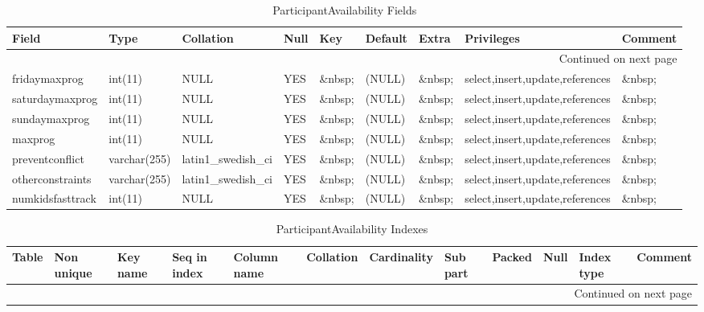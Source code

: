 \documentclass[tablesignature,landscape]{scrartcl}
\begin{document}
\begin{longtable}{|l|l|l|l|l|l|l|l|l|}
\caption{ParticipantAvailability Fields} \label{tbl:participantavailabilityfields}\\
\hline
 Field             &  Type          &  Collation                &  Null     &  Key      &  Default  &  Extra    &  Privileges                       &  Comment \\
\hline
\endhead
\hline\multicolumn{9}{r}{Continued on next page}\
\endfoot
\endlastfoot
\hline
 badgeid           &  varchar(15)   &  latin1\_{}swedish\_{}ci  &  \&nbsp;  &  PRI      &  \&nbsp;  &  \&nbsp;  &  select,insert,update,references  &  \&nbsp;  \\
 fridaymaxprog     &  int(11)       &  NULL                     &  YES      &  \&nbsp;  &  (NULL)   &  \&nbsp;  &  select,insert,update,references  &  \&nbsp;  \\
 saturdaymaxprog   &  int(11)       &  NULL                     &  YES      &  \&nbsp;  &  (NULL)   &  \&nbsp;  &  select,insert,update,references  &  \&nbsp;  \\
 sundaymaxprog     &  int(11)       &  NULL                     &  YES      &  \&nbsp;  &  (NULL)   &  \&nbsp;  &  select,insert,update,references  &  \&nbsp;  \\
 maxprog           &  int(11)       &  NULL                     &  YES      &  \&nbsp;  &  (NULL)   &  \&nbsp;  &  select,insert,update,references  &  \&nbsp;  \\
 preventconflict   &  varchar(255)  &  latin1\_{}swedish\_{}ci  &  YES      &  \&nbsp;  &  (NULL)   &  \&nbsp;  &  select,insert,update,references  &  \&nbsp;  \\
 otherconstraints  &  varchar(255)  &  latin1\_{}swedish\_{}ci  &  YES      &  \&nbsp;  &  (NULL)   &  \&nbsp;  &  select,insert,update,references  &  \&nbsp;  \\
 numkidsfasttrack  &  int(11)       &  NULL                     &  YES      &  \&nbsp;  &  (NULL)   &  \&nbsp;  &  select,insert,update,references  &  \&nbsp;  \\
\hline
\end{longtable}


\begin{longtable}{|l|l|l|l|l|l|l|l|l|l|l|l|}
\caption{ParticipantAvailability Indexes} \label{tbl:participantavailabilityindexes}\\
\hline
 Table                    &  Non unique  &  Key name  &  Seq in index  &  Column name  &  Collation  &  Cardinality  &  Sub part  &  Packed  &  Null     &  Index type  &  Comment \\
\hline
\endhead
\hline\multicolumn{12}{r}{Continued on next page}\
\endfoot
\endlastfoot
\hline
 ParticipantAvailability  &           0  &  PRIMARY   &             1  &  badgeid      &  A          &            2  &  (NULL)    &  (NULL)  &  \&nbsp;  &  BTREE       &  \&nbsp;  \\
\hline
\end{longtable}
\end{document}
